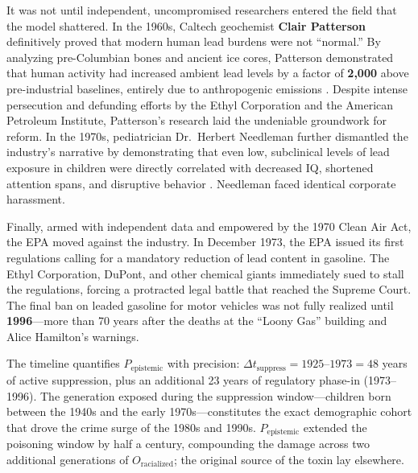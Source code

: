It was not until independent, uncompromised researchers entered the field that the model shattered. In the 1960s, Caltech geochemist \textbf{Clair Patterson} definitively proved that modern human lead burdens were not ``normal.'' By analyzing pre-Columbian bones and ancient ice cores, Patterson demonstrated that human activity had increased ambient lead levels by a factor of \textbf{2,000} above pre-industrial baselines, entirely due to anthropogenic emissions \cite{tel_patterson}. Despite intense persecution and defunding efforts by the Ethyl Corporation and the American Petroleum Institute, Patterson's research laid the undeniable groundwork for reform. In the 1970s, pediatrician Dr.\ Herbert Needleman further dismantled the industry's narrative by demonstrating that even low, subclinical levels of lead exposure in children were directly correlated with decreased IQ, shortened attention spans, and disruptive behavior \cite{tel_needleman}. Needleman faced identical corporate harassment.

Finally, armed with independent data and empowered by the 1970 Clean Air Act, the EPA moved against the industry. In December 1973, the EPA issued its first regulations calling for a mandatory reduction of lead content in gasoline. The Ethyl Corporation, DuPont, and other chemical giants immediately sued to stall the regulations, forcing a protracted legal battle that reached the Supreme Court. The final ban on leaded gasoline for motor vehicles was not fully realized until \textbf{1996}---more than 70 years after the deaths at the ``Loony Gas'' building and Alice Hamilton's warnings.

The timeline quantifies $P_{\text{epistemic}}$ with precision: $\Delta t_{\text{suppress}} = 1925 \text{--} 1973 = 48$ years of active suppression, plus an additional 23 years of regulatory phase-in (1973--1996). The generation exposed during the suppression window---children born between the 1940s and the early 1970s---constitutes the exact demographic cohort that drove the crime surge of the 1980s and 1990s. $P_{\text{epistemic}}$ extended the poisoning window by half a century, compounding the damage across two additional generations of $O_{\text{racialized}}$; the original source of the toxin lay elsewhere.

